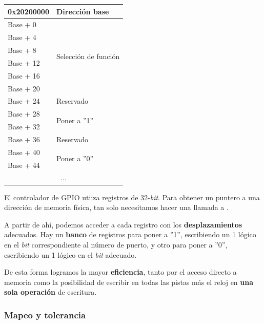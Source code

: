 \begin{center}
	\begin{tabular}{|l|l|}
		\hline 0x20200000 & Dirección base \\
		\hline
		\hline Base + 0 & \multirow{6}{*}{Selección de función} \\
		\cline{1-1} Base + 4 & \\
		\cline{1-1} Base + 8 & \\
		\cline{1-1} Base + 12 & \\
		\cline{1-1} Base + 16 & \\
		\cline{1-1} Base + 20 & \\
		\hline Base + 24 & Reservado \\
		\hline Base + 28 & \multirow{2}{*}{Poner a ''1''} \\
		\cline{1-1} Base + 32 & \\
		\hline Base + 36 & Reservado \\
		\hline Base + 40 & \multirow{2}{*}{Poner a ''0''} \\
		\cline{1-1} Base + 44 & \\
		\hline \multicolumn{2}{|c|}{...} \\
		\hline 
	\end{tabular}
	\smallskip
\end{center}

\smallskip

El controlador de \acrshort{GPIO} utiiza registros de 32-\textit{bit}. Para obtener un puntero a una dirección de memoria física, tan solo necesitamos hacer una llamada a  \cite{soii}. 

A partir de ahí, podemos acceder a cada registro con los \textbf{desplazamientos} adecuados. Hay un \textbf{banco} de registros para poner a ''1'', escribiendo un 1 lógico en el \textit{bit} correspondiente al número de puerto, y otro para poner a ''0'', escribiendo un 1 lógico en el \textit{bit} adecuado.

De esta forma logramos la mayor \textbf{eficiencia}, tanto por el acceso directo a memoria como la posibilidad de escribir en todas las pistas más el reloj en \textbf{una sola operación} de escritura.

\subsubsection{Mapeo y tolerancia}

